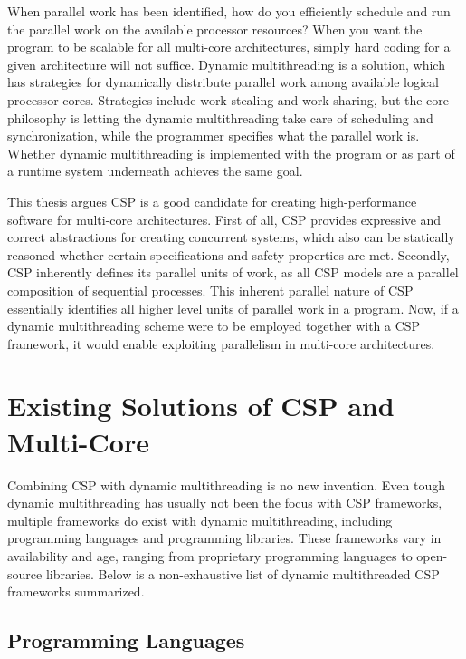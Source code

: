When parallel work has been identified, how do you efficiently schedule and run the parallel work on the available processor resources? When you want the program to be scalable for all multi\hyp{}core architectures, simply hard coding for a given architecture will not suffice. Dynamic multithreading is a solution, which has strategies for dynamically distribute parallel work among available logical processor cores. Strategies include work stealing and work sharing, but the core philosophy is letting the dynamic multithreading take care of scheduling and synchronization, while the programmer specifies what the parallel work is. Whether dynamic multithreading is implemented with the program or as part of a runtime system underneath achieves the same goal. 

This thesis argues CSP is a good candidate for creating high\hyp{}performance software for multi\hyp{}core architectures. First of all, CSP provides expressive and correct abstractions for creating concurrent systems, which also can be statically reasoned whether certain specifications and safety properties are met. Secondly, CSP inherently defines its parallel units of work, as all CSP models are a parallel composition of sequential processes. This inherent parallel nature of CSP essentially identifies all higher level units of parallel work in a program. Now, if a dynamic multithreading scheme were to be employed together with a CSP framework, it would enable exploiting parallelism in multi\hyp{}core architectures.


\section{Existing Solutions of CSP and Multi\hyp{}Core}
\label{sec:multicore_csp_existing}


Combining CSP with dynamic multithreading is no new invention. Even tough dynamic multithreading has usually not been the focus with CSP frameworks, multiple frameworks do exist with dynamic multithreading, including programming languages and programming libraries. These frameworks vary in availability and age, ranging from proprietary programming languages to open\hyp{}source libraries. Below is a non\hyp{}exhaustive list of dynamic multithreaded CSP frameworks summarized.


\subsection{Programming Languages}



